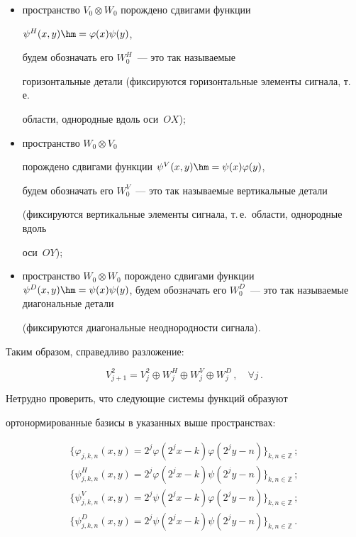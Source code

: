 \begin{itemize}

    \item пространство $V_0 \otimes W_0$ порождено сдвигами функции 

    $\psi^H(x,y)\hm=\varphi(x)\psi(y)$,

            будем обозначать его $W_0^H$~--- это так называемые 

            горизонтальные детали (фиксируются горизонтальные элементы сигнала, т.\,е.\ 

            области, однородные вдоль оси~$OX$);

    \item пространство $W_0 \otimes V_0$ 

    порождено сдвигами функции $\psi^V(x,y)\hm=\psi(x)\varphi(y)$,

            будем обозначать его $W_0^V$~--- это так называемые вертикальные детали 

            (фиксируются вертикальные элементы сигнала, т.\,е.\ области, однородные вдоль 

            оси~$OY$);

    \item  пространство $W_0 \otimes W_0$ порождено сдвигами функции $\psi^D(x,y)\hm=

    \psi(x)\psi(y)$,  будем обозначать его $W_0^D$~--- это так называемые диагональные детали 

    (фиксируются диагональные неоднородности сигнала).

\end{itemize}



Таким образом, справедливо разложение:

$$

    V_{j+1}^2=V_j^2 \oplus W_j^H \oplus W_j^V \oplus W_j^D\,, \quad \forall j\,.

$$



Нетрудно проверить, что следующие системы функций образуют

ортонормированные базисы в указанных выше пространствах:

\begin{gather*}

    \{\varphi_{j,k,n}(x,y)=2^j\varphi(2^jx-k)\varphi(2^jy-n)\}_{k,n \in \mathbb{Z}}\,;\\

    \{\psi_{j,k,n}^H(x,y)=2^j\varphi(2^jx-k)\psi(2^jy-n)\}_{k,n \in \mathbb{Z}}\,;\\

    \{\psi_{j,k,n}^V(x,y)=2^j\psi(2^jx-k)\varphi(2^jy-n)\}_{k,n \in \mathbb{Z}}\,;\\

    \{\psi_{j,k,n}^D(x,y)=2^j\psi(2^jx-k)\psi(2^jy-n)\}_{k,n \in \mathbb{Z}}\,.

\end{gather*}



